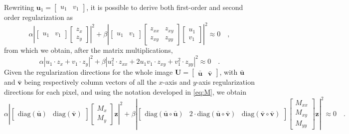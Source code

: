 Rewriting $\mathbf{u}_1 = \begin{bmatrix} u_1 & v_1\end{bmatrix}$, it is possible to derive both first-order and second order regularization as
\begin{equation}
\alpha \left\lvert \begin{bmatrix} u_1 & v_1 \end{bmatrix} \begin{bmatrix} z_x \\ z_y \end{bmatrix} \right\rvert ^2 + 
\beta \left\lvert \begin{bmatrix} u_1 & v_1 \end{bmatrix} \begin{bmatrix} z_{xx} & z_{xy} \\ z_{xy} & z_{yy} \end{bmatrix} \begin{bmatrix} u_1 \\ v_1 \end{bmatrix} \right\rvert ^2 \approx 0
\quad,
\end{equation}
from which we obtain, after the matrix multiplications, 
\begin{equation}
\alpha \left\lvert u_1\cdot{}z_x + v_1\cdot{}z_y  \right\rvert ^2 + 
\beta \left\lvert  u_1^2\cdot{}z_{xx} + 2u_1v_1\cdot{}z_{xy} + v_1^2\cdot{}z_{yy} \right\rvert ^2
\approx 0
\quad.
\end{equation}
Given the regularization directions for the whole image $\mathbf{U} = \begin{bmatrix}\bar{\mathbf{u}} & \bar{\mathbf{v}} \end{bmatrix}$, with $\bar{\mathbf{u}}$ and $\bar{\mathbf{v}}$ being respectively column vectors of all the $x$-axis and $y$-axis regularization directions for each pixel, and using the notation developed in \eqref{eq:M}, we obtain
\begin{equation}
\alpha \left\lvert
\begin{bmatrix} \mathrm{diag}(\bar{\mathbf{u}}) & \mathrm{diag}(\bar{\mathbf{v}}) \end{bmatrix}
\begin{bmatrix}
M_x \\
M_y
\end{bmatrix}
\mathbf{z}
\right\rvert ^2 + 
\beta \left\lvert
\begin{bmatrix} \mathrm{diag}(\bar{\mathbf{u}} \circ \bar{\mathbf{u}}) &  2\cdot{}\mathrm{diag}(\bar{\mathbf{u}} \circ \bar{\mathbf{v}}) & \mathrm{diag}(\bar{\mathbf{v}} \circ \bar{\mathbf{v}})
\end{bmatrix}
\begin{bmatrix} M_{xx} \\ M_{xy} \\ M_{yy} \end{bmatrix}
\mathbf{z}
\right\rvert ^2
\approx 0
\quad.
\end{equation}
